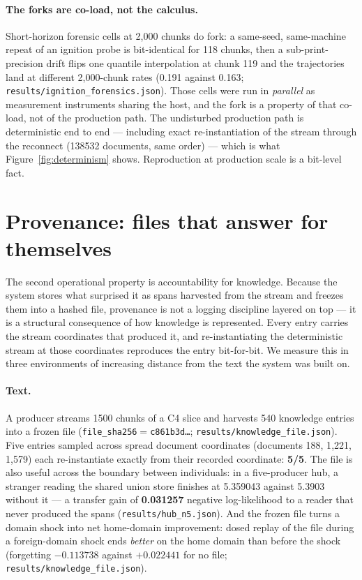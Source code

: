 \documentclass[11pt]{article}
\theoremstyle{definition}
\newcommand{\code}[1]{\texttt{#1}}
\begin{document}
\paragraph{The forks are co-load, not the calculus.} Short-horizon forensic
cells at 2{,}000 chunks do fork: a same-seed, same-machine repeat of an
ignition probe is bit-identical for 118 chunks, then a sub-print-precision
drift flips one quantile interpolation at chunk 119 and the trajectories land
at different 2{,}000-chunk rates (\num{0.191} against \num{0.163};
\code{results/ignition\_forensics.json}). Those cells were run in
\emph{parallel} as measurement instruments sharing the host, and the fork is a
property of that co-load, not of the production path. The undisturbed
production path is deterministic end to end --- including exact
re-instantiation of the stream through the reconnect (\num{138532} documents,
same order) --- which is what Figure~\ref{fig:determinism} shows. Reproduction
at production scale is a bit-level fact.

\section{Provenance: files that answer for themselves}
\label{sec:provenance}

The second operational property is accountability for knowledge. Because the
system stores what surprised it as spans harvested from the stream and freezes
them into a hashed file, provenance is not a logging discipline layered on top
--- it is a structural consequence of how knowledge is represented. Every
entry carries the stream coordinates that produced it, and re-instantiating
the deterministic stream at those coordinates reproduces the entry bit-for-bit.
We measure this in three environments of increasing distance from the text the
system was built on.

\paragraph{Text.} A producer streams \num{1500} chunks of a C4 slice and
harvests \num{540} knowledge entries into a frozen file
(\code{file\_sha256}${=}$\code{c861b3d\ldots};
\code{results/knowledge\_file.json}). Five entries sampled across spread
document coordinates (documents 188, 1{,}221, 1{,}579) each re-instantiate
exactly from their recorded coordinate: \textbf{5/5}. The file is also useful
across the boundary between individuals: in a five-producer hub, a stranger
reading the shared union store finishes at \num{5.359043} against \num{5.3903}
without it --- a transfer gain of \textbf{\num{0.031257}} negative
log-likelihood to a reader that never produced the spans
(\code{results/hub\_n5.json}). And the frozen file turns a domain shock into
net home-domain improvement: dosed replay of the file during a foreign-domain
shock ends \emph{better} on the home domain than before the shock
(forgetting \textbf{$-\num{0.113738}$} against $+\num{0.022441}$ for no file;
\code{results/knowledge\_file.json}).
\end{document}
